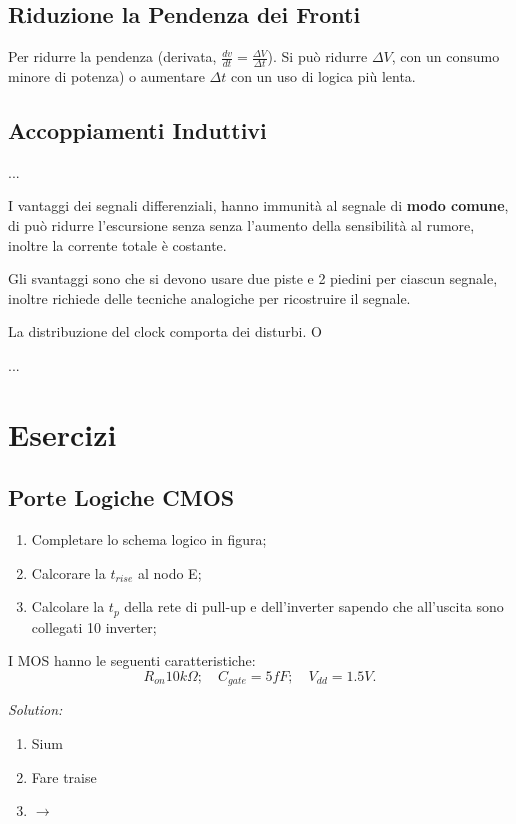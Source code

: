 \documentclass[12pt]{article}
\begin{document}
\subsection{Riduzione la Pendenza dei Fronti}
Per ridurre la pendenza (derivata, $\frac{dv}{dt} = \frac{\Delta V}{\Delta t}$). Si pu\`o ridurre $\Delta V$, con un consumo minore di potenza) o aumentare $\Delta t$ con un uso di logica pi\`u lenta.

\subsection{Accoppiamenti Induttivi}
...

I vantaggi dei segnali differenziali, hanno immunit\`a al segnale di \textbf{modo comune}, di pu\`o ridurre l'escursione senza senza l'aumento della sensibilit\`a al rumore, inoltre la corrente totale \`e costante.

Gli svantaggi sono che si devono usare due piste e 2 piedini per ciascun segnale, inoltre richiede delle tecniche analogiche per ricostruire il segnale.

La distribuzione del clock comporta dei disturbi. O

...















\newpage
\section{Esercizi}

\subsection{Porte Logiche CMOS}

\begin{problem}{}{}
    \begin{enumerate}
        \item Completare lo schema logico in figura;
        \item Calcorare la $t_{rise}$ al nodo E;
        \item Calcolare la $t_p$ della rete di pull-up e dell'inverter sapendo che all'uscita sono collegati 10 inverter;
    \end{enumerate}
    I MOS hanno le seguenti caratteristiche:
    \[ R _{on} 10k\Omega;\quad C _{gate} = 5fF;\quad V _{dd} = 1.5V .\]
    
    \emph{Solution:}
    \begin{enumerate}
        \item Sium
        \item Fare traise
        \item $\to$
    \end{enumerate}
\end{problem}
\end{document}
